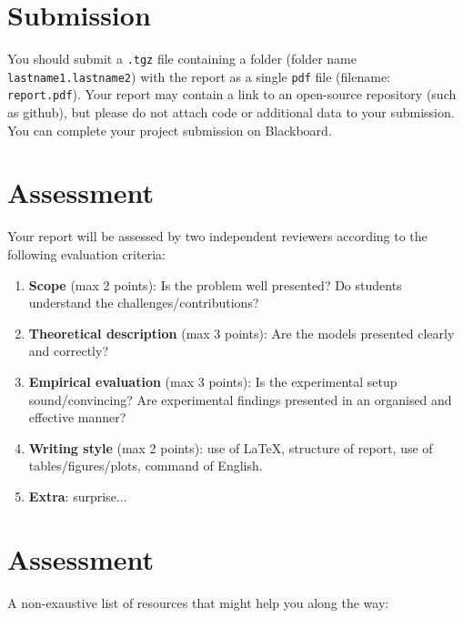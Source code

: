 \section{Submission}

You should submit a \texttt{.tgz} file containing a folder (folder name {\tt lastname1.lastname2}) with the report as a single \texttt{pdf} file (filename: {\tt report.pdf}).
Your report may contain a link to an open-source repository (such as github), but please do not attach code or additional data to your submission. You can complete your project submission on Blackboard.

\section{Assessment}

Your report will be assessed by two independent reviewers according to the following evaluation criteria:
\begin{enumerate}
	\item \textbf{Scope} (max 2 points): Is the problem well presented? Do students understand the challenges/contributions?
	\item \textbf{Theoretical description} (max 3 points): Are the models presented clearly and correctly?
	\item \textbf{Empirical evaluation} (max 3 points): Is the experimental setup sound/convincing? Are experimental findings presented in an organised and effective manner? 
	\item \textbf{Writing style} (max 2 points): use of \LaTeX , structure of report, use of tables/figures/plots, command of English.
	\item \textbf{Extra}: surprise...
\end{enumerate}




\section{Assessment}

A non-exaustive list of resources that might help you along the way:

